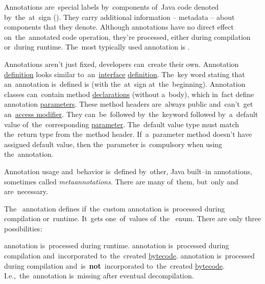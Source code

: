 \label{javaannotation}
Annotations are~special labels by~components of~Java code denoted by~the~at~sign ().
They carry additional information -- metadata -- about components that they denote.
Although annotations have no direct effect on~the~annotated code operation, they're processed, either during compilation or~during runtime.
The~most typically used annotation is \hyperref[javaoverride]{}.

\label{javacustomannotations}
Annotations aren't just fixed, developers can~create their own.
Annotation \hyperref[declarationdefinition]{definition} looks similar to~an~\hyperref[javainterface]{interface} \hyperref[declarationdefinition]{definition}.
The~key word stating that an~annotation is~defined is  (with the~at~sign at~the~beginning).
Annotation classes can~contain method \hyperref[declarationdefinition]{declarations} (without a~body), which in~fact define annotation \hyperref[parameterargument]{parameters}.
These method headers are~always public and~can't~get an~\hyperref[javaaccessmodifiers]{access modifier}.
They can~be~followed by~the~keyword  followed by~a~default value of~the~corresponding \hyperref[parameterargument]{parameter}.
The~default value type must match the~return type from the~method header.
If~a~parameter method doesn't have assigned default value, then the~parameter is~compulsory when using the~annotation.

Annotation usage and~behavior is~defined by~other, Java built--in annotations, sometimes called \textit{metaannotations}.
There are many of~them, but~only  and~ are~necessary.

The~ annotation defines if~the~custom annotation is~processed during compilation or~runtime.
It~gets one~of~values of~the~ enum.
There are only three possibilities:
\begin{itemize}
     annotation is~processed during runtime.
     annotation is~processed during compilation and~incorporated to~the~created \hyperref[javabytecode]{bytecode}.
     annotation is~processed during compilation and~is~\textbf{not}~incorporated to~the~created \hyperref[javabytecode]{bytecode}.
             I.e.,~the~annotation is~missing after eventual decompilation.
\end{itemize}

